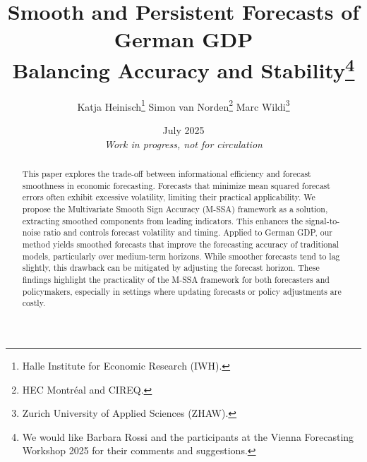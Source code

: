 \documentclass[11pt,a4paper]{article}
\begin{document}
\setlength{\abovedisplayskip}{2cm}
\setlength{\abovedisplayshortskip}{2cm}
\setlength{\belowdisplayskip}{0cm}
\setlength{\belowdisplayshortskip}{2cm} %




\title{Smooth and Persistent Forecasts of German GDP\\ Balancing Accuracy and Stability\thanks{We would like Barbara Rossi and the participants at the Vienna Forecasting Workshop 2025 for their comments and suggestions.}}
\author{Katja Heinisch\thanks{Halle Institute for Economic Research (IWH).} \hspace{0.2cm}
Simon van Norden\thanks{HEC Montréal and CIREQ.} \hspace{0.2cm}
Marc Wildi\thanks{Zurich University of Applied Sciences (ZHAW).}}
\date{July 2025 \\
\vspace{2cm} \textit{Work in progress, not for circulation}}



\maketitle
\maketitle

\begin{abstract} %
This paper explores the trade-off between informational efficiency and forecast smoothness in economic forecasting. Forecasts that minimize mean squared forecast errors often exhibit excessive volatility, limiting their practical applicability. We propose the Multivariate Smooth Sign Accuracy (M-SSA) framework as a solution, extracting smoothed components from leading indicators. This enhances the signal-to-noise ratio and controls forecast volatility and timing. Applied to German GDP, our method yields smoothed forecasts that improve the forecasting accuracy of traditional models, particularly over medium-term horizons. While smoother forecasts tend to lag slightly, this drawback can be mitigated by adjusting the forecast horizon. These findings highlight the practicality of the M-SSA framework for both forecasters and policymakers, especially in settings where updating forecasts or policy adjustments are costly.

\end{abstract}
\end{document}
